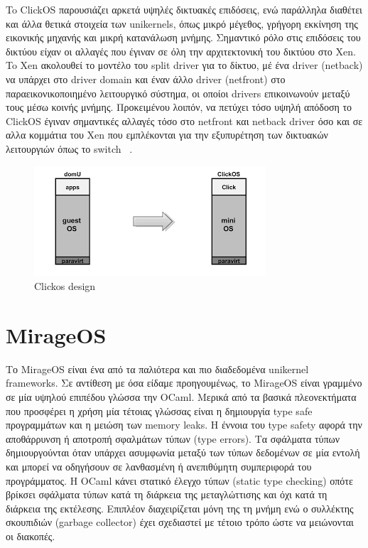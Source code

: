 To ClickOS παρουσιάζει αρκετά υψηλές δικτυακές επιδόσεις, ενώ παράλληλα διαθέτει
και άλλα θετικά στοιχεία των unikernels, όπως μικρό μέγεθος, γρήγορη εκκίνηση
της εικονικής μηχανής και μικρή κατανάλωση μνήμης. Σημαντικό ρόλο στις επιδόσεις
του δικτύου είχαν οι αλλαγές που έγιναν σε όλη την αρχιτεκτονική του δικτύου στο
Xen. To Χen ακολουθεί το μοντέλο του split driver για το δίκτυο, μέ ένα driver
(netback) να υπάρχει στο driver domain και έναν άλλο driver (netfront) στο
παραεικονικοποιημένο λειτουργικό σύστημα, οι οποίοι drivers επικοινωνούν μεταξύ
τους μέσω κοινής μνήμης. Προκειμένου λοιπόν, να πετύχει τόσο
υψηλή απόδοση το ClickOS έγιναν σημαντικές αλλαγές τόσο στο netfront και netback
driver όσο και σε αλλα κομμάτια του Xen που εμπλέκονται για την εξυπυρέτηση των
δικτυακών λειτουργιών όπως το switch ~\cite{martins2014clickos}.  

\begin{figure}[htp]
\centering
\includegraphics[scale=0.6]{figures/clickos.png}
\caption{Clickos design\label{fig3_6}}
\end{figure}

\section{MirageOS}

Το MirageOS είναι ένα από τα παλιότερα και πιο διαδεδομένα unikernel frameworks.
Σε αντίθεση με όσα είδαμε προηγουμένως, το MirageOS είναι γραμμένο σε
μία υψηλού επιπέδου γλώσσα την OCaml. Μερικά από τα βασικά πλεονεκτήματα που
προσφέρει η χρήση μία τέτοιας γλώσσας είναι η δημιουργία type safe προγραμμάτων
και η μειώση των memory leaks. Η έννοια του type safety αφορά
την αποθάρρυνση ή αποτροπή σφαλμάτων τύπων (type errors). Τα σφάλματα τύπων
δημιουργούνται όταν υπάρχει ασυμφωνία μεταξύ των τύπων δεδομένων σε μία εντολή
και μπορεί να οδηγήσουν σε λανθασμένη ή ανεπιθύμητη συμπεριφορά του
προγράμματος. Η OCaml κάνει στατικό έλεγχο τύπων (static type checking) οπότε
βρίκσει σφάλματα τύπων κατά τη διάρκεια της μεταγλώττισης και όχι κατά τη
διάρκεια της εκτέλεσης. Επιπλέον διαχειρίζεται μόνη της τη μνήμη ενώ ο συλλέκτης
σκουπιδιών (garbage collector) έχει σχεδιαστεί με τέτοιο τρόπο ώστε να
μειώνονται οι διακοπές.


